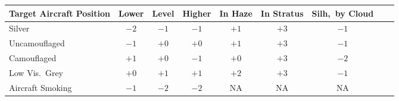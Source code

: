 \begin{twocolumntable}
\begin{tabular}{lcccccccc}
\toprule
Target Aircraft Position&Lower&Level&Higher&In Haze&In Stratus&Silh,\ by Cloud\\
\midrule
Silver          &$-2$&$-1$&$-1$&$+1$&$+3$&$-1$\\
Uncamouflaged   &$-1$&$+0$&$+0$&$+1$&$+3$&$-1$\\
Camouflaged     &$+1$&$+0$&$-1$&$+0$&$+3$&$-2$\\
Low Vis.\ Grey  &$+0$&$+1$&$+1$&$+2$&$+3$&$-1$\\
Aircraft Smoking&$-1$&$-2$&$-2$&NA&NA&NA\\
\bottomrule
\end{tabular}
\end{twocolumntable}

